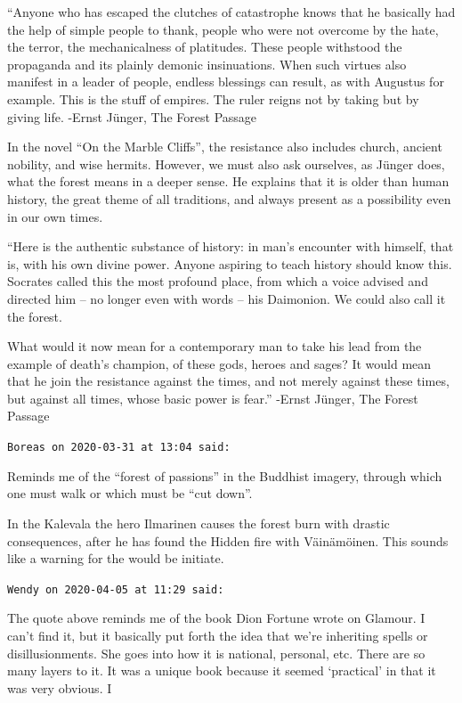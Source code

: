 \begin{footnotesize}
\begin{sffamily}
``Anyone who has escaped the clutches of catastrophe knows that he basically had the help of simple people to thank, people who were not overcome by the hate, the terror, the mechanicalness of platitudes. These people withstood the propaganda and its plainly demonic insinuations. When such virtues also manifest in a leader of people, endless blessings can result, as with Augustus for example. This is the stuff of empires. The ruler reigns not by taking but by giving life. -Ernst Jünger, The Forest Passage

In the novel ``On the Marble Cliffs'', the resistance also includes church, ancient nobility, and wise hermits. However, we must also ask ourselves, as Jünger does, what the forest means in a deeper sense. He explains that it is older than human history, the great theme of all traditions, and always present as a possibility even in our own times.

``Here is the authentic substance of history: in man's encounter with himself, that is, with his own divine power. Anyone aspiring to teach history should know this. Socrates called this the most profound place, from which a voice advised and directed him -- no longer even with words -- his Daimonion. We could also call it the forest.

What would it now mean for a contemporary man to take his lead from the example of death's champion, of these gods, heroes and sages? It would mean that he join the resistance against the times, and not merely against these times, but against all times, whose basic power is fear.'' -Ernst Jünger, The Forest Passage

\hfill

\texttt{Boreas on 2020-03-31 at 13:04 said:}

Reminds me of the ``forest of passions'' in the Buddhist imagery, through which one must walk or which must be ``cut down''.

In the Kalevala the hero Ilmarinen causes the forest burn with drastic consequences, after he has found the Hidden fire with Väinämöinen. This sounds like a warning for the would be initiate.

\hfill

\texttt{Wendy on 2020-04-05 at 11:29 said:}

The quote above reminds me of the book Dion Fortune wrote on Glamour. I can't find it, but it basically put forth the idea that we're inheriting spells or disillusionments. She goes into how it is national, personal, etc. There are so many layers to it. It was a unique book because it seemed `practical' in that it was very obvious. I

\end{sffamily}
\end{footnotesize}

